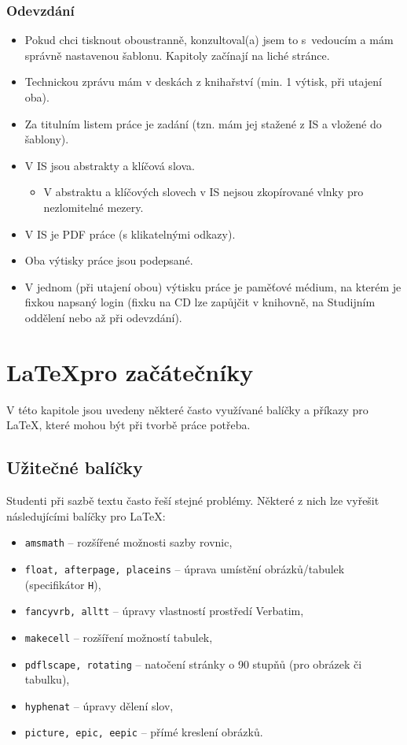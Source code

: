 \subsubsection*{Odevzdání}

\begin{itemize}
\item Pokud chci tisknout oboustranně, konzultoval(a) jsem to s~vedoucím a mám správně nastavenou šablonu. Kapitoly začínají na liché stránce.
\item Technickou zprávu mám v deskách z knihařství (min. 1 výtisk, při utajení oba).
\item Za titulním listem práce je zadání (tzn. mám jej stažené z IS a vložené do šablony).
\item V IS jsou abstrakty a klíčová slova.
  \begin{itemize}
    \item V abstraktu a klíčových slovech v IS nejsou zkopírované vlnky pro nezlomitelné mezery.
  \end{itemize}      
\item V IS je PDF práce (s klikatelnými odkazy).
\item Oba výtisky práce jsou podepsané.
\item V jednom (při utajení obou) výtisku práce je paměťové médium, na kterém je fixkou napsaný login (fixku na CD lze zapůjčit v knihovně, na Studijním oddělení nebo až při odevzdání).
\end{itemize}


\section{\LaTeX pro začátečníky}
\label{latex}

V této kapitole jsou uvedeny některé často využívané balíčky a příkazy pro \LaTeX{}, které mohou být při tvorbě práce potřeba.

\subsection*{Užitečné balíčky}

Studenti při sazbě textu často řeší stejné problémy. Některé z nich lze vyřešit následujícími balíčky pro \LaTeX:

\begin{itemize}
  \item \verb|amsmath| -- rozšířené možnosti sazby rovnic,
  \item \verb|float, afterpage, placeins| -- úprava umístění obrázků/tabulek (specifikátor \texttt{H}),
  \item \verb|fancyvrb, alltt| -- úpravy vlastností prostředí Verbatim, 
  \item \verb|makecell| -- rozšíření možností tabulek,
  \item \verb|pdflscape, rotating| -- natočení stránky o 90 stupňů (pro obrázek či tabulku),
  \item \verb|hyphenat| -- úpravy dělení slov,
  \item \verb|picture, epic, eepic| -- přímé kreslení obrázků.
\end{itemize}

